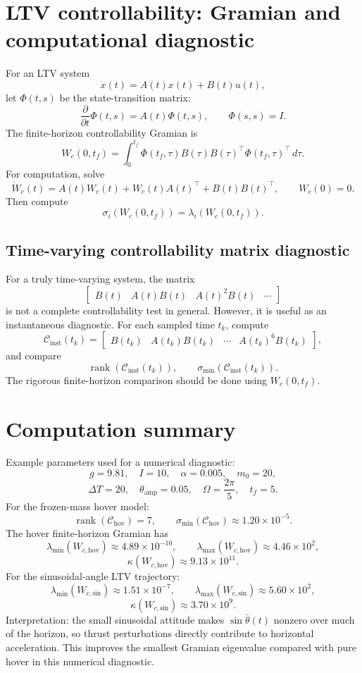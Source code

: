 \documentclass[10pt]{article}
\newcommand{\thb}{\bar\theta}
\newcommand{\vphi}{\alpha}
\begin{document}
\section{LTV controllability: Gramian and computational diagnostic}
For an LTV system
\[
    \dot x(t)=A(t)x(t)+B(t)u(t),
\]
let $\Phi(t,s)$ be the state-transition matrix:
\[
    \frac{\partial}{\partial t}\Phi(t,s)=A(t)\Phi(t,s),
    \qquad
    \Phi(s,s)=I.
\]
The finite-horizon controllability Gramian is
\[
    \boxed{W_c(0,t_f)=\int_0^{t_f}\Phi(t_f,\tau)B(\tau)B(\tau)^{\top}\Phi(t_f,\tau)^{\top}\,d\tau.}
\]
For computation, solve
\[
    \boxed{\dot W_c(t)=A(t)W_c(t)+W_c(t)A(t)^{\top}+B(t)B(t)^{\top},\qquad W_c(0)=0.}
\]
Then compute
\[
    \boxed{\sigma_i(W_c(0,t_f))=\lambda_i(W_c(0,t_f))}.
\]

\subsection*{Time-varying controllability matrix diagnostic}
For a truly time-varying system, the matrix
\[
    \begin{bmatrix}B(t)&A(t)B(t)&A(t)^2B(t)&\cdots\end{bmatrix}
\]
is not a complete controllability test in general. However, it is useful as an instantaneous diagnostic. For each sampled time $t_k$, compute
\[
    \mathcal C_{\mathrm{inst}}(t_k)=
    \begin{bmatrix}B(t_k)&A(t_k)B(t_k)&\cdots&A(t_k)^{6}B(t_k)\end{bmatrix},
\]
and compare
\[
    \operatorname{rank}(\mathcal C_{\mathrm{inst}}(t_k)),
    \qquad
    \sigma_{\min}(\mathcal C_{\mathrm{inst}}(t_k)).
\]
The rigorous finite-horizon comparison should be done using $W_c(0,t_f)$.

\section{Computation summary}
Example parameters used for a numerical diagnostic:
\[
    g=9.81,\quad I=10,\quad \vphi=0.005,\quad m_0=20,
\]
\[
    \Delta T=20,\quad \theta_{\mathrm{amp}}=0.05,\quad \Omega=\frac{2\pi}{5},\quad t_f=5.
\]
For the frozen-mass hover model:
\[
    \operatorname{rank}(\mathcal C_{\mathrm{hov}})=7,
    \qquad
    \sigma_{\min}(\mathcal C_{\mathrm{hov}})\approx 1.20\times 10^{-5}.
\]
The hover finite-horizon Gramian has
\[
    \lambda_{\min}(W_{c,\mathrm{hov}})\approx 4.89\times 10^{-10},
    \qquad
    \lambda_{\max}(W_{c,\mathrm{hov}})\approx 4.46\times 10^2,
\]
\[
    \kappa(W_{c,\mathrm{hov}})\approx 9.13\times 10^{11}.
\]
For the sinusoidal-angle LTV trajectory:
\[
    \lambda_{\min}(W_{c,\mathrm{sin}})\approx 1.51\times 10^{-7},
    \qquad
    \lambda_{\max}(W_{c,\mathrm{sin}})\approx 5.60\times 10^2,
\]
\[
    \kappa(W_{c,\mathrm{sin}})\approx 3.70\times 10^9.
\]
Interpretation: the small sinusoidal attitude makes $\sin\thb(t)$ nonzero over much of the horizon, so thrust perturbations directly contribute to horizontal acceleration. This improves the smallest Gramian eigenvalue compared with pure hover in this numerical diagnostic.
\end{document}
